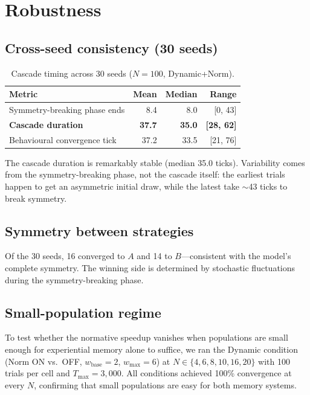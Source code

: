 \documentclass[11pt,a4paper]{article}
\begin{document}
\section{Robustness}
\label{sec:robustness}

\subsection{Cross-seed consistency (30 seeds)}

\begin{table}[H]
\centering
\caption{Cascade timing across 30 seeds ($N = 100$, Dynamic+Norm).}
\label{tab:robustness}
\begin{tabular}{@{}l rrr@{}}
\toprule
Metric & Mean & Median & Range \\
\midrule
Symmetry-breaking phase ends & 8.4 & 8.0 & [0, 43] \\
\textbf{Cascade duration} & \textbf{37.7} & \textbf{35.0} & \textbf{[28, 62]} \\
Behavioural convergence tick & 37.2 & 33.5 & [21, 76] \\
\bottomrule
\end{tabular}
\end{table}

The cascade duration is remarkably stable (median 35.0 ticks). Variability comes from the symmetry-breaking phase, not the cascade itself: the earliest trials happen to get an asymmetric initial draw, while the latest take $\sim$43 ticks to break symmetry.

\subsection{Symmetry between strategies}

Of the 30 seeds, 16 converged to $A$ and 14 to $B$---consistent with the model's complete symmetry. The winning side is determined by stochastic fluctuations during the symmetry-breaking phase.

\subsection{Small-population regime}
\label{sec:small_N}

To test whether the normative speedup vanishes when populations are small enough for experiential memory alone to suffice, we ran the Dynamic condition (Norm ON vs.\ OFF, $w_{\mathrm{base}}{=}2$, $w_{\max}{=}6$) at $N \in \{4, 6, 8, 10, 16, 20\}$ with 100 trials per cell and $T_{\max}{=}3{,}000$. All conditions achieved 100\% convergence at every $N$, confirming that small populations are easy for both memory systems.
\end{document}
